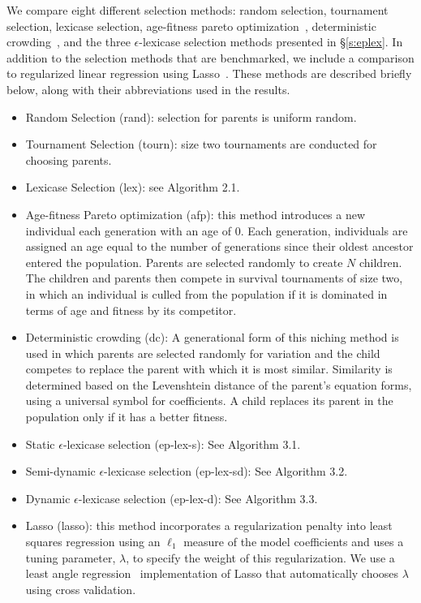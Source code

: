 \documentclass[twoside]{article}
\begin{document}
We compare eight different selection methods: random selection, tournament selection, lexicase selection, age-fitness pareto optimization~\citep{schmidt_age-fitness_2011}, deterministic crowding~\citep{mahfoud_niching_1995}, and the three $\epsilon$-lexicase selection methods presented in \S\ref{s:eplex}. In addition to the selection methods that are benchmarked, we include a comparison to regularized linear regression using Lasso~\citep{tibshirani_regression_1996}. These methods are described briefly below, along with their abbreviations used in the results.
\begin{itemize}
\item Random Selection (rand): selection for parents is uniform random.
\item Tournament Selection (tourn): size two tournaments are conducted for choosing parents. 
\item Lexicase Selection (lex): see Algorithm 2.1. 
\item Age-fitness Pareto optimization (afp): this method introduces a new individual each generation with an age of 0. Each generation, individuals are assigned an age equal to the number of generations since their oldest ancestor entered the population. Parents are selected randomly to create $N$ children. The children and parents then compete in survival tournaments of size two, in which an individual is culled from the population if it is dominated in terms of age and fitness by its competitor. 
\item Deterministic crowding (dc): A generational form of this niching method is used in which parents are selected randomly for variation and the child competes to replace the parent with which it is most similar. Similarity is determined based on the Levenshtein distance of the parent's equation forms, using a universal symbol for coefficients. A child replaces its parent in the population only if it has a better fitness.
\item Static $\epsilon$-lexicase selection (ep-lex-s): See Algorithm 3.1.
\item Semi-dynamic $\epsilon$-lexicase selection (ep-lex-sd): See Algorithm 3.2.
\item Dynamic $\epsilon$-lexicase selection (ep-lex-d): See Algorithm 3.3.
\item Lasso (lasso): this method incorporates a regularization penalty into least squares regression using an $\ell_1$ measure of the model coefficients and uses a tuning parameter, $\lambda$, to specify the weight of this regularization. We use a least angle regression~\citep{efron_least_2004} implementation of Lasso that automatically chooses $\lambda$ using cross validation.
\end{itemize} 
\end{document}
